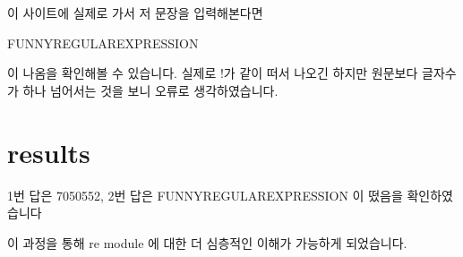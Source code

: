 \documentclass[12pt]{extarticle}
\begin{document}
	이 사이트에 실제로 가서 저 문장을 입력해본다면 \newline


	FUNNYREGULAREXPRESSION\newline

    이 나옴을 확인해볼 수 있습니다. 실제로 !가 같이 떠서 나오긴 하지만 원문보다 글자수가 하나 넘어서는 것을 보니 오류로 생각하였습니다. \newline
	
	
	\section{results}

	1번 답은 7050552, 2번 답은 FUNNYREGULAREXPRESSION 이 떴음을 확인하였습니다 \newline

	이 과정을 통해 re module 에 대한 더 심층적인 이해가 가능하게 되었습니다. 
\end{document}
